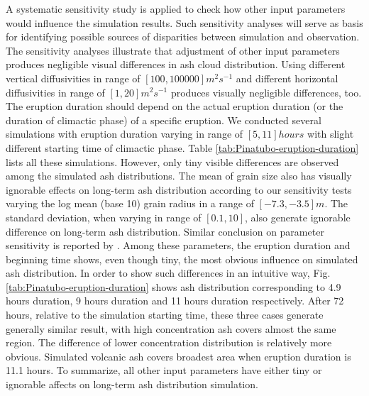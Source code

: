 A systematic sensitivity study is applied to check how other input parameters would influence the simulation results. Such sensitivity analyses will serve as basis for identifying possible sources of disparities between simulation and observation.
The sensitivity analyses illustrate that adjustment of other input parameters produces negligible visual differences in ash cloud distribution. Using different vertical diffusivities in range of $[100, 100000] m^2s^{-1} $ and different horizontal diffusivities in range of $[1, 20] m^2s^{-1}$ produces visually negligible differences, too. 
The eruption duration should depend on the actual eruption duration (or the duration of climactic phase) of a specific eruption. We conducted several simulations with eruption duration varying in range of $[5, 11] hours$ with slight different starting time of climactic phase. Table \ref{tab:Pinatubo-eruption-duration} lists all these simulations. However, only tiny visible differences are observed among the simulated ash distributions. The mean of grain size also has visually ignorable effects on long-term ash distribution according to our sensitivity tests varying the log mean (base 10) grain radius in a range of $[-7.3, -3.5] m$. 
The standard deviation, when varying in range of $[0.1, 10]$, also generate ignorable difference on long-term ash distribution. Similar conclusion on parameter sensitivity is reported by \citet{fero2008simulation}.
Among these parameters, the eruption duration and beginning time shows, even though tiny, the most obvious influence on simulated ash distribution. In order to show such differences in an intuitive way, Fig. \ref{tab:Pinatubo-eruption-duration} shows ash distribution corresponding to 4.9 hours duration, 9 hours duration and 11 hours duration respectively. After 72 hours, relative to the simulation starting time, these three cases generate generally similar result, with high concentration ash covers almost the same region. The difference of lower concentration distribution is relatively more obvious. Simulated volcanic ash covers broadest area when eruption duration is 11.1 hours. To summarize, all other input parameters have either tiny or ignorable affects on long-term ash distribution simulation. 

